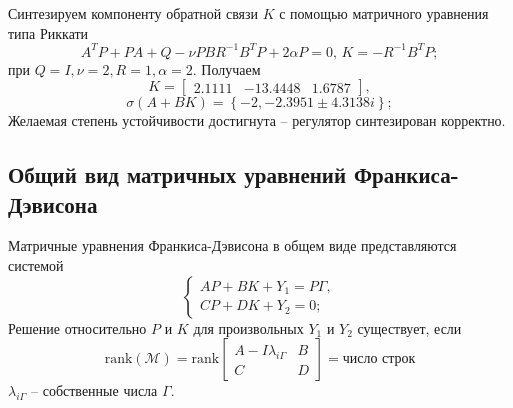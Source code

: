 \documentclass[a4paper, 12pt]{article}
\begin{document}
    Синтезируем компоненту обратной связи $K$ с помощью матричного уравнения
    типа Риккати
    $$
    A^TP+PA+Q-\nu PBR^{-1}B^TP+2\alpha P=0,\,K=-R^{-1}B^TP;
    $$
    при $Q=I,\nu=2,R=1,\alpha=2$. Получаем
    $$
    K=\begin{bmatrix}
        2.1111  &-13.4448    &1.6787
    \end{bmatrix},$$
    $$
    \sigma\left( A+BK \right)=\left\{ -2,-2.3951\pm 4.3138i \right\};
    $$
    Желаемая степень устойчивости достигнута -- регулятор синтезирован корректно.


    \subsection{Общий вид матричных уравнений Франкиса-Дэвисона}
    Матричные уравнения Франкиса-Дэвисона в общем виде представляются системой
    $$
    \begin{cases}
        AP+BK+Y_1=P\Gamma,\\
        CP+DK+Y_2=0;
    \end{cases}
    $$
    Решение относительно $P$ и $K$ для произвольных
    $Y_1$ и $Y_2$ существует, если
    $$
    \text{rank}\left( \mathcal{M} \right)=\text{rank}\begin{bmatrix}
        A-I\lambda_{i\Gamma} &B\\
        C &D
    \end{bmatrix}=\text{число строк}
    $$
    $\lambda_{i\Gamma}$ -- собственные числа $\Gamma$.
\end{document}
